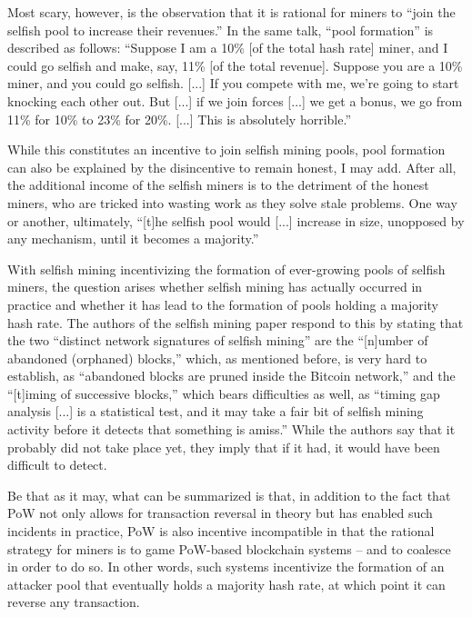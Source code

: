 Most scary, however, is the observation that it is rational for miners to  ``join the selfish pool to increase their revenues.'' \autocite{youtube2018alternativestotonakamotoconsensus}
In the same talk, ``pool formation'' is described as follows:
``Suppose I am a 10\% [of the total hash rate] miner, and I could go selfish and make, say, 11\% [of the total revenue].
Suppose you are a 10\% miner, and you could go selfish. [...]
If you compete with me, we're going to start knocking each other out.
But [...] if we join forces [...] we get a bonus, we go from 11\% for 10\% to 23\% for 20\%. [...]
This is absolutely horrible.'' \autocite{youtube2018alternativestotonakamotoconsensus}

While this constitutes an incentive to join selfish mining pools, pool formation can also be explained by the disincentive to remain honest, I may add.
After all, the additional income of the selfish miners is to the detriment of the honest miners, who are tricked into wasting work as they solve stale problems.
One way or another, ultimately, ``[t]he selfish pool would [...] increase in size, unopposed by any mechanism, until it becomes a majority.'' \autocite{youtube2018alternativestotonakamotoconsensus}

With selfish mining incentivizing the formation of ever-growing pools of selfish miners, the question arises whether selfish mining has actually occurred in practice and whether it has lead to the formation of pools holding a majority hash rate.
The authors of the selfish mining paper respond to this \autocite{hackingdistributed2014detectselfishminers} by stating that the two ``distinct network signatures of selfish mining'' are the ``[n]umber of abandoned (orphaned) blocks,'' which, as mentioned before, is very hard to establish, as ``abandoned blocks are pruned inside the Bitcoin network,'' and the ``[t]iming of successive blocks,'' which bears difficulties as well, as ``timing gap analysis [...] is a statistical test, and it may take a fair bit of selfish mining activity before it detects that something is amiss.''
While the authors say that it probably did not take place yet, they imply that if it had, it would have been difficult to detect.

Be that as it may, what can be summarized is that, in addition to the fact that PoW not only allows for transaction reversal in theory but has enabled such incidents in practice, PoW is also incentive incompatible in that the rational strategy for miners is to game PoW-based blockchain systems -- and to coalesce in order to do so.
In other words, such systems incentivize the formation of an attacker pool that eventually holds a majority hash rate, at which point it can reverse any transaction.

